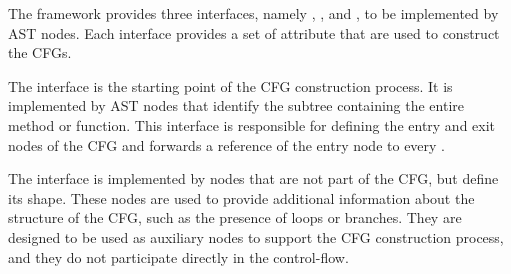 The framework provides three interfaces, namely , , and ,
to be implemented by AST nodes. Each interface provides a set of attribute that are used to construct
the CFGs.

The  interface is the starting point of the CFG construction process.
It is implemented by AST nodes that identify the subtree containing the entire method 
or function. This interface is responsible for defining the entry and exit nodes of the CFG and 
forwards a reference of the entry node to every .


The  interface is implemented by nodes that are not part of the CFG,
but define its shape. These nodes are used to provide additional information 
about the structure of the CFG, such as the presence of loops or branches. 
They are designed to be used as auxiliary nodes to support the CFG construction 
process, and they do not participate directly in the control-flow.